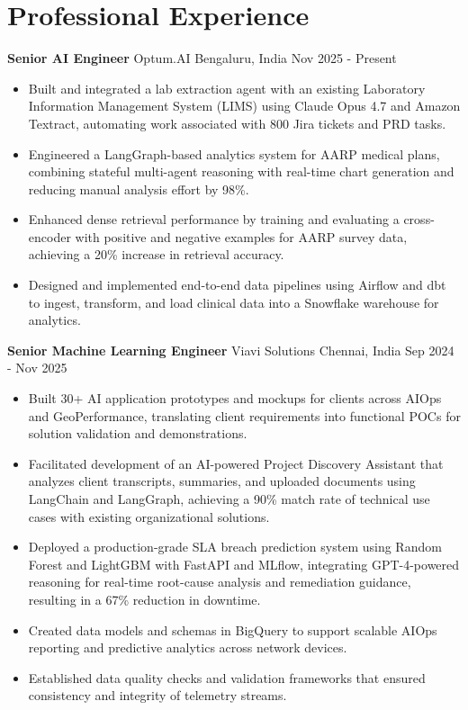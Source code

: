 \documentclass[10pt,a4paper]{article}
\newcommand{\role}[4]{\textbf{#1} \textbar{} #2 \hfill #3 \textbar{} #4\par}
\begin{document}
\section{Professional Experience}
\role{Senior AI Engineer}{Optum.AI}{Bengaluru, India}{Nov 2025 - Present}
\begin{itemize}
  \item Built and integrated a lab extraction agent with an existing Laboratory Information Management System (LIMS) using Claude Opus 4.7 and Amazon Textract, automating work associated with 800 Jira tickets and PRD tasks.
  \item Engineered a LangGraph-based analytics system for AARP medical plans, combining stateful multi-agent reasoning with real-time chart generation and reducing manual analysis effort by 98\%.
  \item Enhanced dense retrieval performance by training and evaluating a cross-encoder with positive and negative examples for AARP survey data, achieving a 20\% increase in retrieval accuracy.
  \item Designed and implemented end-to-end data pipelines using Airflow and dbt to ingest, transform, and load clinical data into a Snowflake warehouse for analytics.
\end{itemize}
\vspace{3pt}
\role{Senior Machine Learning Engineer}{Viavi Solutions}{Chennai, India}{Sep 2024 - Nov 2025}
\begin{itemize}
  \item Built 30+ AI application prototypes and mockups for clients across AIOps and GeoPerformance, translating client requirements into functional POCs for solution validation and demonstrations.
  \item Facilitated development of an AI-powered Project Discovery Assistant that analyzes client transcripts, summaries, and uploaded documents using LangChain and LangGraph, achieving a 90\% match rate of technical use cases with existing organizational solutions.
  \item Deployed a production-grade SLA breach prediction system using Random Forest and LightGBM with FastAPI and MLflow, integrating GPT-4-powered reasoning for real-time root-cause analysis and remediation guidance, resulting in a 67\% reduction in downtime.
  \item Created data models and schemas in BigQuery to support scalable AIOps reporting and predictive analytics across network devices.
  \item Established data quality checks and validation frameworks that ensured consistency and integrity of telemetry streams.
\end{itemize}
\end{document}
